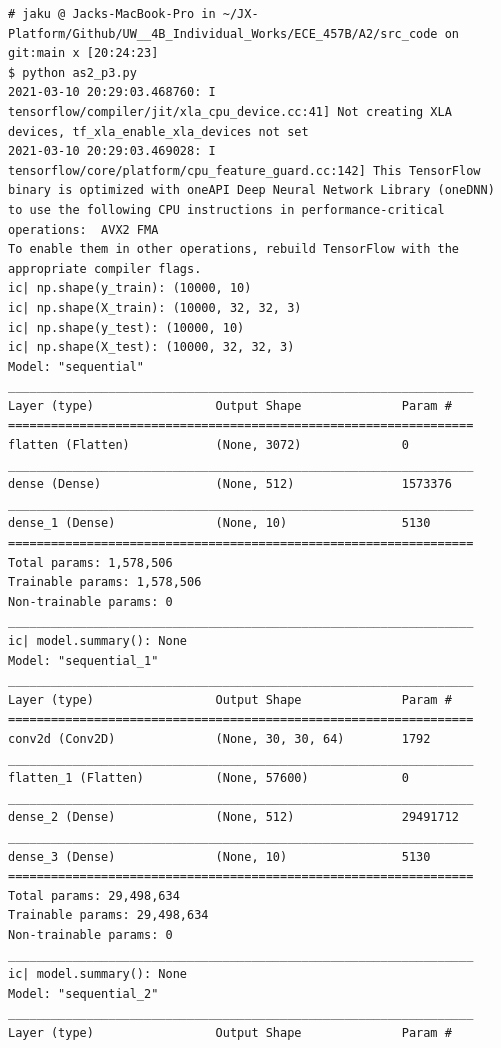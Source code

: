 \documentclass{tron}
\begin{document}
\begin{lstlisting}[style=mystyle:output]
# jaku @ Jacks-MacBook-Pro in ~/JX-Platform/Github/UW__4B_Individual_Works/ECE_457B/A2/src_code on git:main x [20:24:23]
$ python as2_p3.py
2021-03-10 20:29:03.468760: I tensorflow/compiler/jit/xla_cpu_device.cc:41] Not creating XLA devices, tf_xla_enable_xla_devices not set
2021-03-10 20:29:03.469028: I tensorflow/core/platform/cpu_feature_guard.cc:142] This TensorFlow binary is optimized with oneAPI Deep Neural Network Library (oneDNN) to use the following CPU instructions in performance-critical operations:  AVX2 FMA
To enable them in other operations, rebuild TensorFlow with the appropriate compiler flags.
ic| np.shape(y_train): (10000, 10)
ic| np.shape(X_train): (10000, 32, 32, 3)
ic| np.shape(y_test): (10000, 10)
ic| np.shape(X_test): (10000, 32, 32, 3)
Model: "sequential"
_________________________________________________________________
Layer (type)                 Output Shape              Param #
=================================================================
flatten (Flatten)            (None, 3072)              0
_________________________________________________________________
dense (Dense)                (None, 512)               1573376
_________________________________________________________________
dense_1 (Dense)              (None, 10)                5130
=================================================================
Total params: 1,578,506
Trainable params: 1,578,506
Non-trainable params: 0
_________________________________________________________________
ic| model.summary(): None
Model: "sequential_1"
_________________________________________________________________
Layer (type)                 Output Shape              Param #
=================================================================
conv2d (Conv2D)              (None, 30, 30, 64)        1792
_________________________________________________________________
flatten_1 (Flatten)          (None, 57600)             0
_________________________________________________________________
dense_2 (Dense)              (None, 512)               29491712
_________________________________________________________________
dense_3 (Dense)              (None, 10)                5130
=================================================================
Total params: 29,498,634
Trainable params: 29,498,634
Non-trainable params: 0
_________________________________________________________________
ic| model.summary(): None
Model: "sequential_2"
_________________________________________________________________
Layer (type)                 Output Shape              Param #

\end{lstlisting}
\end{document}
